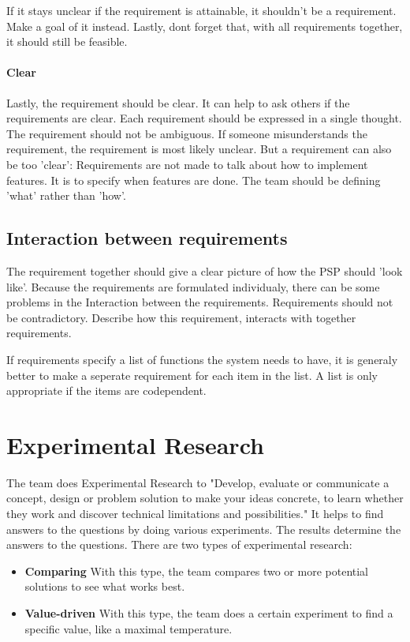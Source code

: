 \documentclass[10pt]{report}
\begin{document}
\noindent If it stays unclear if the requirement is attainable, it shouldn't be a requirement. Make a goal of it instead. Lastly, dont forget that, with all requirements together, it should still be feasible.

\paragraph{Clear}

Lastly, the requirement should be clear. It can help to ask others if the requirements are clear. Each requirement should be expressed in a single thought. The requirement should not be ambiguous. If someone misunderstands the requirement, the requirement is most likely unclear. But a requirement can also be too 'clear': Requirements are not made to talk about how to implement features. It is to specify when features are done. The team should be defining 'what' rather than 'how'.

\subsection{Interaction between requirements}

The requirement together should give a clear picture of how the PSP should 'look like'. Because the requirements are formulated individualy, there can be some problems in the Interaction between the requirements. Requirements should not be contradictory. Describe how this requirement, interacts with together requirements. 

If requirements specify a list of functions the system needs to have, it is generaly better to make a seperate requirement for each item in the list. A list is only appropriate if the items are codependent.

\newpage

\section{Experimental Research}

The team does Experimental Research to "Develop, evaluate or communicate a concept, design or problem solution to make your ideas concrete, to learn whether they work and discover technical limitations and possibilities." It helps to find answers to the questions by doing various experiments. The results determine the answers to the questions. There are two types of experimental research:

\begin{itemize}
	\item \textbf{Comparing} With this type, the team compares two or more potential solutions to see what works best.
	\item \textbf{Value-driven} With this type, the team does a certain experiment to find a specific value, like a maximal temperature.
\end{itemize}
\end{document}
